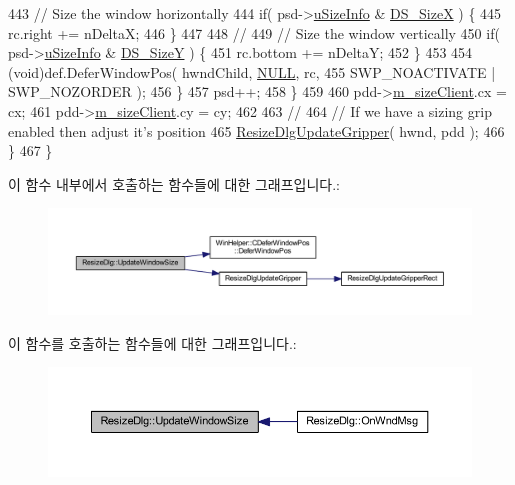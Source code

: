 \begin{DoxyCode}
443         \textcolor{comment}{//      Size the window horizontally}
444         \textcolor{keywordflow}{if}( psd->\mbox{\hyperlink{struct_dialog_sizer_sizing_item_af673815342f29c205ec14476c57269c2}{uSizeInfo}} & \mbox{\hyperlink{_resize_dlg_8h_a21713fd373c62604a1ee3d5d831101ad}{DS\_SizeX}} ) \{
445           rc.right += nDeltaX;
446         \}
447         
448         \textcolor{comment}{//}
449         \textcolor{comment}{//      Size the window vertically}
450         \textcolor{keywordflow}{if}( psd->\mbox{\hyperlink{struct_dialog_sizer_sizing_item_af673815342f29c205ec14476c57269c2}{uSizeInfo}} & \mbox{\hyperlink{_resize_dlg_8h_a783821ba6bb984916d55f46cdf90cb2b}{DS\_SizeY}} ) \{
451           rc.bottom += nDeltaY;
452         \}
453         
454         (void)def.DeferWindowPos( hwndChild, \mbox{\hyperlink{getopt1_8c_a070d2ce7b6bb7e5c05602aa8c308d0c4}{NULL}}, rc,
455                                   SWP\_NOACTIVATE | SWP\_NOZORDER );
456       \}
457       psd++;
458     \}
459     
460     pdd->\mbox{\hyperlink{struct_dialog_data_af63c4c59aa42a272798f9af446fc4484}{m\_sizeClient}}.cx = cx;
461     pdd->\mbox{\hyperlink{struct_dialog_data_af63c4c59aa42a272798f9af446fc4484}{m\_sizeClient}}.cy = cy;
462     
463     \textcolor{comment}{//}
464     \textcolor{comment}{//  If we have a sizing grip enabled then adjust it's position}
465     \mbox{\hyperlink{_resize_dlg_8cpp_a1de1329cfe834f6067987ae67b4db837}{ResizeDlgUpdateGripper}}( hwnd, pdd );
466   \}
467 \}
\end{DoxyCode}
이 함수 내부에서 호출하는 함수들에 대한 그래프입니다.\+:
\nopagebreak
\begin{figure}[H]
\begin{center}
\leavevmode
\includegraphics[width=350pt]{class_resize_dlg_ae2d0d2b44dd32f668c6d9091b14bfc00_cgraph}
\end{center}
\end{figure}
이 함수를 호출하는 함수들에 대한 그래프입니다.\+:
\nopagebreak
\begin{figure}[H]
\begin{center}
\leavevmode
\includegraphics[width=350pt]{class_resize_dlg_ae2d0d2b44dd32f668c6d9091b14bfc00_icgraph}
\end{center}
\end{figure}


